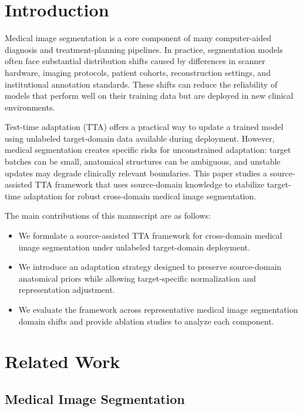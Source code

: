 \documentclass[diagnostics,article,submit,pdftex,moreauthors]{Definitions/mdpi}
\begin{document}
\section{Introduction}

Medical image segmentation is a core component of many computer-aided diagnosis and treatment-planning pipelines. In practice, segmentation models often face substantial distribution shifts caused by differences in scanner hardware, imaging protocols, patient cohorts, reconstruction settings, and institutional annotation standards. These shifts can reduce the reliability of models that perform well on their training data but are deployed in new clinical environments.

Test-time adaptation (TTA) offers a practical way to update a trained model using unlabeled target-domain data available during deployment. However, medical segmentation creates specific risks for unconstrained adaptation: target batches can be small, anatomical structures can be ambiguous, and unstable updates may degrade clinically relevant boundaries. This paper studies a source-assisted TTA framework that uses source-domain knowledge to stabilize target-time adaptation for robust cross-domain medical image segmentation.

The main contributions of this manuscript are as follows:
\begin{itemize}
\item We formulate a source-assisted TTA framework for cross-domain medical image segmentation under unlabeled target-domain deployment.
\item We introduce an adaptation strategy designed to preserve source-domain anatomical priors while allowing target-specific normalization and representation adjustment.
\item We evaluate the framework across representative medical image segmentation domain shifts and provide ablation studies to analyze each component.
\end{itemize}

\section{Related Work}

\subsection{Medical Image Segmentation}
\end{document}
